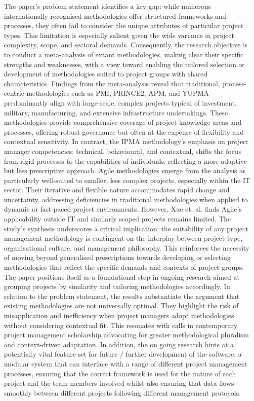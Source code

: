 \documentclass{report}
\begin{document}
The paper’s problem statement identifies a key gap: while numerous internationally recognised methodologies offer structured frameworks and processes, they often fail to consider the unique attributes of particular project types. This limitation is especially salient given the wide variance in project complexity, scope, and sectoral demands. Consequently, the research objective is to conduct a meta-analysis of extant methodologies, making clear their specific strengths and weaknesses, with a view toward enabling the tailored selection or development of methodologies suited to project groups with shared characteristics.
Findings from the meta-analysis reveal that traditional, process-centric methodologies such as PMI, PRINCE2, APM, and YUPMA predominantly align with large-scale, complex projects typical of investment, military, manufacturing, and extensive infrastructure undertakings. These methodologies provide comprehensive coverage of project knowledge areas and processes, offering robust governance but often at the expense of flexibility and contextual sensitivity. In contrast, the IPMA methodology’s emphasis on project manager competencies: technical, behavioural, and contextual, shifts the focus from rigid processes to the capabilities of individuals, reflecting a more adaptive but less prescriptive approach.
Agile methodologies emerge from the analysis as particularly well-suited to smaller, less complex projects, especially within the IT sector. Their iterative and flexible nature accommodates rapid change and uncertainty, addressing deficiencies in traditional methodologies when applied to dynamic or fast-paced project environments. However, Xue et. al. finds Agile’s applicability outside IT and similarly scoped projects remains limited.
The study’s synthesis underscores a critical implication: the suitability of any project management methodology is contingent on the interplay between project type, organisational culture, and management philosophy. This reinforces the necessity of moving beyond generalised prescriptions towards developing or selecting methodologies that reflect the specific demands and contexts of project groups. The paper positions itself as a foundational step in ongoing research aimed at grouping projects by similarity and tailoring methodologies accordingly.
In relation to the problem statement, the results substantiate the argument that existing methodologies are not universally optimal. They highlight the risk of misapplication and inefficiency when project managers adopt methodologies without considering contextual fit. This resonates with calls in contemporary project management scholarship advocating for greater methodological pluralism and context-driven adaptation. In addition, the on going research hints at a potentially vital feature set for future / further development of the software: a modular system that can interface with a range of different project management processes, ensuring that the correct framework is used for the nature of each project and the team members involved whilst also ensuring that data flows smoothly between different projects following different management protocols. 
\end{document}
